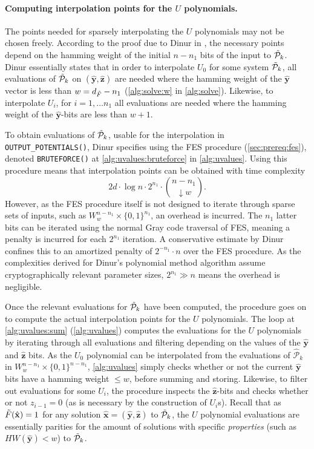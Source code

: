 \paragraph{Computing interpolation points for the $U$ polynomials.} The points needed for sparsely interpolating the $U$ polynomials may not be chosen freely. According to the proof due to Dinur in \cite{eurocrypt-2021-30841}, the necessary points depend on the hamming weight of the initial $n - n_1$ bits of the input to $\Tilde{\mathcal{P}}_k$. Dinur essentially states that in order to interpolate $U_0$ for some system $\Tilde{\mathcal{P}}_k$, all evaluations of $\Tilde{\mathcal{P}}_k$ on $(\hat{\mathbf{y}}, \hat{\mathbf{z}})$ are needed where the hamming weight of the $\hat{\mathbf{y}}$ vector is less than $w = d_{\Tilde{F}} - n_1$ (\cref{alg:solve:w} in \cref{alg:solve}). Likewise, to interpolate $U_i$, for $i = 1, \dots n_1$ all evaluations are needed where the hamming weight of the $\hat{\mathbf{y}}$-bits are less than $w + 1$.

To obtain evaluations of $\Tilde{\mathcal{P}}_k$, usable for the interpolation in \texttt{OUTPUT\_POTENTIALS()}, Dinur specifies using the FES procedure (\cref{sec:prereq:fes}), denoted \texttt{BRUTEFORCE()} at \cref{alg:uvalues:bruteforce} in \cref{alg:uvalues}. Using this procedure means that interpolation points can be obtained with time complexity 
$$
    2d \cdot \log n \cdot 2^{n_1} \cdot \binom{n - n_1}{\downarrow w}.
$$
However, as the FES procedure itself is not designed to iterate through sparse sets of inputs, such as $W^{n - n_1}_w \times \{0, 1\}^{n_1}$, an overhead is incurred. The $n_1$ latter bits can be iterated using the normal Gray code traversal of FES, meaning a penalty is incurred for each $2^{n_1}$ iteration. A conservative estimate by Dinur confines this to an amortized penalty of $2^{- n_1} \cdot n$ over the FES procedure. As the complexities derived for Dinur's polynomial method algorithm assume cryptographically relevant parameter sizes, $2^{n_1} \gg n$ means the overhead is negligible.

Once the relevant evaluations for $\Tilde{\mathcal{P}}_k$ have been computed, the procedure goes on to compute the actual interpolation points for the $U$ polynomials. The loop at \cref{alg:uvalues:sum} (\cref{alg:uvalues}) computes the evaluations for the $U$ polynomials by iterating through all evaluations and filtering depending on the values of the $\hat{\mathbf{y}}$ and $\hat{\mathbf{z}}$ bits. As the $U_0$ polynomial can be interpolated from the evaluations of $\hat{\mathcal{P}}_k$ in $W^{n - n_1}_w \times \{0, 1\}^{n - n_1}$, \cref{alg:uvalues} simply checks whether or not the current $\hat{\mathbf{y}}$ bits have a hamming weight $\leq w$, before summing and storing. Likewise, to filter out evaluations for some $U_i$, the procedure inspects the $\hat{\mathbf{z}}$-bits and checks whether or not $z_{i - 1} = 0$ (as is necessary by the construction of $U_i$s). Recall that as $\Tilde{F}(\hat{\mathbf{x}})= 1$ for any solution $\hat{\mathbf{x}} = (\hat{\mathbf{y}}, \hat{\mathbf{z}})$ to $\Tilde{\mathcal{P}}_k$, the $U$ polynomial evaluations are essentially parities for the amount of solutions with specific \textit{properties} (such as $HW(\hat{\mathbf{y}}) < w$) to $\Tilde{\mathcal{P}}_k$.


